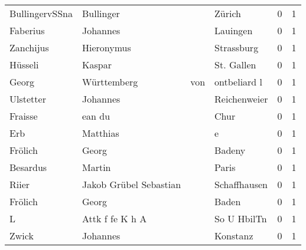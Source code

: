\begin{center}
\begin{tiny}
\begin{longtabu}{llllrr}
           BullingervSSna &                          Bullinger &             &                                      Zürich &          0 &         1 \\
                 Faberius &                           Johannes &             &                                    Lauingen &          0 &         1 \\
                Zanchijus &                         Hieronymus &             &                                  Strassburg &          0 &         1 \\
                  Hüsseli &                             Kaspar &             &                                  St. Gallen &          0 &         1 \\
                    Georg &                        Württemberg &         von &                                ontbeliard l &          0 &         1 \\
                Ulstetter &                           Johannes &             &                                Reichenweier &          0 &         1 \\
                  Fraisse &                             ean du &             &                                        Chur &          0 &         1 \\
                      Erb &                           Matthias &             &                                           e &          0 &         1 \\
                  Frölich &                              Georg &             &                                      Badeny &          0 &         1 \\
                 Besardus &                             Martin &             &                                       Paris &          0 &         1 \\
                    Riier &             Jakob Grübel Sebastian &             &                                Schaffhausen &          0 &         1 \\
                  Frölich &                              Georg &             &                                       Baden &          0 &         1 \\
                        L &                    Attk f fe K h A &             &                                 So U HbilTn &          0 &         1 \\
                    Zwick &                           Johannes &             &                                    Konstanz &          0 &         1 \\

\end{longtabu}
\end{tiny}
\end{center}
